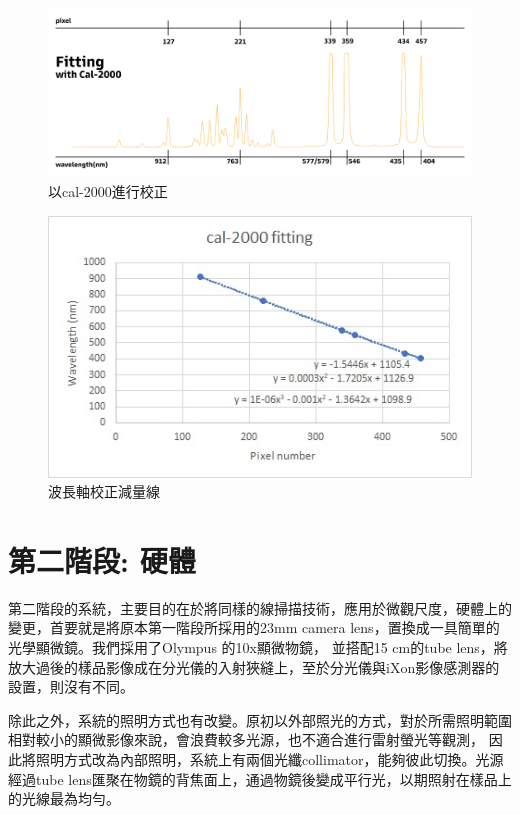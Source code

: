 \documentclass[12pt]{article}
\begin{document}
    \begin{figure}[t]
        \centering
        \includegraphics[width=\linewidth]{fitting.jpg}
        \caption{以cal-2000進行校正}
        \label{figure: fitting}
    \end{figure}
    \begin{figure}[t]
        \centering
        \includegraphics[width=\linewidth]{cal-2000fitting.jpg}
        \caption[]{波長軸校正減量線\protect\footnotemark}
        \label{figure: fit curve}
    \end{figure}
    \section{第二階段: 硬體}
    第二階段的系統，主要目的在於將同樣的線掃描技術，應用於微觀尺度，硬體上的變更，首要就是將原本第一階段所採用的23mm camera lens，置換成一具簡單的光學顯微鏡。我們採用了Olympus 的10x顯微物鏡，
    並搭配15 cm的tube lens，將放大過後的樣品影像成在分光儀的入射狹縫上，至於分光儀與iXon影像感測器的設置，則沒有不同。

    除此之外，系統的照明方式也有改變。原初以外部照光的方式，對於所需照明範圍相對較小的顯微影像來說，會浪費較多光源，也不適合進行雷射螢光等觀測，
    因此將照明方式改為內部照明，系統上有兩個光纖collimator，能夠彼此切換。光源經過tube lens匯聚在物鏡的背焦面上，通過物鏡後變成平行光，以期照射在樣品上的光線最為均勻。
\end{document}
